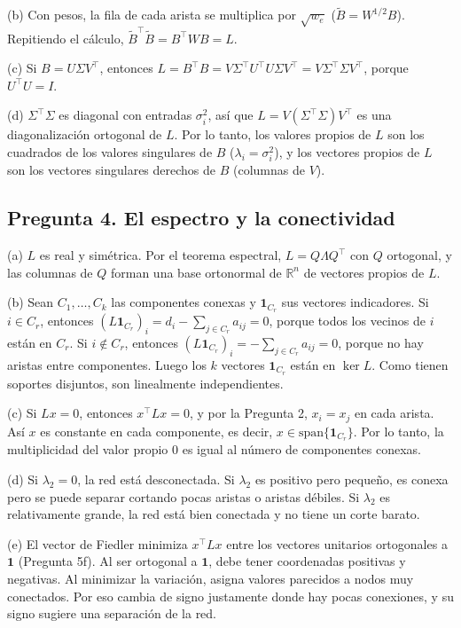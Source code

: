 \documentclass[11pt,a4paper]{article}
\newcommand{\uno}{\mathbf{1}}
\begin{document}
(b) Con pesos, la fila de cada arista se multiplica por $\sqrt{w_e}$ ($\tilde B=W^{1/2}B$). Repitiendo el cálculo, $\tilde B^\top\tilde B=B^\top WB=L$.

(c) Si $B=U\Sigma V^\top$, entonces $L=B^\top B=V\Sigma^\top U^\top U\Sigma V^\top=V\Sigma^\top\Sigma V^\top$, porque $U^\top U=I$.

(d) $\Sigma^\top\Sigma$ es diagonal con entradas $\sigma_i^2$, así que $L=V(\Sigma^\top\Sigma)V^\top$ es una diagonalización ortogonal de $L$. Por lo tanto, los valores propios de $L$ son los cuadrados de los valores singulares de $B$ ($\lambda_i=\sigma_i^2$), y los vectores propios de $L$ son los vectores singulares derechos de $B$ (columnas de $V$).

\subsection{Pregunta 4. El espectro y la conectividad}

(a) $L$ es real y simétrica. Por el teorema espectral, $L=Q\Lambda Q^\top$ con $Q$ ortogonal, y las columnas de $Q$ forman una base ortonormal de $\mathbb{R}^n$ de vectores propios de $L$.

(b) Sean $C_1,\dots,C_k$ las componentes conexas y $\uno_{C_r}$ sus vectores indicadores. Si $i\in C_r$, entonces $(L\uno_{C_r})_i=d_i-\sum_{j\in C_r}a_{ij}=0$, porque todos los vecinos de $i$ están en $C_r$. Si $i\notin C_r$, entonces $(L\uno_{C_r})_i=-\sum_{j\in C_r}a_{ij}=0$, porque no hay aristas entre componentes. Luego los $k$ vectores $\uno_{C_r}$ están en $\ker L$. Como tienen soportes disjuntos, son linealmente independientes.

(c) Si $Lx=0$, entonces $x^\top Lx=0$, y por la Pregunta 2, $x_i=x_j$ en cada arista. Así $x$ es constante en cada componente, es decir, $x\in\mathrm{span}\{\uno_{C_r}\}$. Por lo tanto, la multiplicidad del valor propio 0 es igual al número de componentes conexas.

(d) Si $\lambda_2=0$, la red está desconectada. Si $\lambda_2$ es positivo pero pequeño, es conexa pero se puede separar cortando pocas aristas o aristas débiles. Si $\lambda_2$ es relativamente grande, la red está bien conectada y no tiene un corte barato.

(e) El vector de Fiedler minimiza $x^\top Lx$ entre los vectores unitarios ortogonales a $\uno$ (Pregunta 5f). Al ser ortogonal a $\uno$, debe tener coordenadas positivas y negativas. Al minimizar la variación, asigna valores parecidos a nodos muy conectados. Por eso cambia de signo justamente donde hay pocas conexiones, y su signo sugiere una separación de la red.
\end{document}
